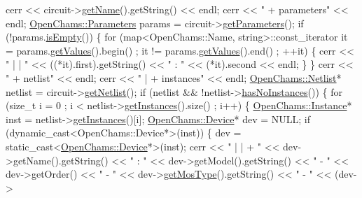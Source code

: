 \begin{DoxyCodeInclude}
    cerr << circuit->\mbox{\hyperlink{class_open_chams_1_1_circuit_a2858c0c4e8b5108f041237cf5a802029}{getName}}().getString() << endl;
    cerr << \textcolor{stringliteral}{" + parameters"} << endl;
    \mbox{\hyperlink{class_open_chams_1_1_parameters}{OpenChams::Parameters}} params = circuit->\mbox{\hyperlink{class_open_chams_1_1_circuit_a2e51ad4344607fc279c5c8cda4edae02}{getParameters}}();
    \textcolor{keywordflow}{if} (!params.\mbox{\hyperlink{class_open_chams_1_1_parameters_af337ffd75e4f019ce15302c60715d84b}{isEmpty}}()) \{
        \textcolor{keywordflow}{for} (map<OpenChams::Name, string>::const\_iterator it = params.\mbox{\hyperlink{class_open_chams_1_1_parameters_a0f890d16c3b2a0bcbdf060854ea07877}{getValues}}().begin() ; it != 
      params.\mbox{\hyperlink{class_open_chams_1_1_parameters_a0f890d16c3b2a0bcbdf060854ea07877}{getValues}}().end() ; ++it) \{
            cerr << \textcolor{stringliteral}{" | | "} << ((*it).first).getString() << \textcolor{stringliteral}{" : "} << (*it).second << endl;
        \}
    \}
    cerr << \textcolor{stringliteral}{" + netlist"} << endl;
    cerr << \textcolor{stringliteral}{" | + instances"} << endl;
    \mbox{\hyperlink{class_open_chams_1_1_netlist}{OpenChams::Netlist}}* netlist = circuit->\mbox{\hyperlink{class_open_chams_1_1_circuit_a4085d6a7b6958ffdd7ab5df7e6d6e53f}{getNetlist}}();
    \textcolor{keywordflow}{if} (netlist && !netlist->\mbox{\hyperlink{class_open_chams_1_1_netlist_adab62a25face462baec9a7fffb2b6158}{hasNoInstances}}()) \{
        \textcolor{keywordflow}{for} (\textcolor{keywordtype}{size\_t} i = 0 ; i < netlist->\mbox{\hyperlink{class_open_chams_1_1_netlist_a8e6e58ffab876152a740092520c35d73}{getInstances}}().size() ; i++) \{
            \mbox{\hyperlink{class_open_chams_1_1_instance}{OpenChams::Instance}}* inst = netlist->\mbox{\hyperlink{class_open_chams_1_1_netlist_a8e6e58ffab876152a740092520c35d73}{getInstances}}()[i];
            \mbox{\hyperlink{class_open_chams_1_1_device}{OpenChams::Device}}*   dev  = NULL;
            \textcolor{keywordflow}{if} (dynamic\_cast<OpenChams::Device*>(inst)) \{
                dev = \textcolor{keyword}{static\_cast<}\mbox{\hyperlink{class_open_chams_1_1_device}{OpenChams::Device}}*\textcolor{keyword}{>}(inst);
                cerr << \textcolor{stringliteral}{" | | + "} << dev->getName().getString() << \textcolor{stringliteral}{" : "} << dev->getModel().getString() << \textcolor{stringliteral}{
      " - "} << dev->getOrder() << \textcolor{stringliteral}{" - "} << dev->\mbox{\hyperlink{class_open_chams_1_1_device_a831ce553c23908f447a5be332ecd5946}{getMosType}}().getString() << \textcolor{stringliteral}{" - "} << (dev->

\end{DoxyCodeInclude}

